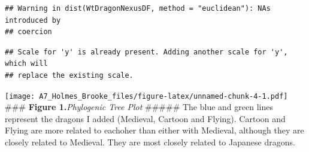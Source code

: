 \documentclass[
]{article}
\newenvironment{Shaded}{\begin{snugshade}}{\end{snugshade}}
\newcommand{\AttributeTok}[1]{\textcolor[rgb]{0.77,0.63,0.00}{#1}}
\newcommand{\CommentTok}[1]{\textcolor[rgb]{0.56,0.35,0.01}{\textit{#1}}}
\newcommand{\DecValTok}[1]{\textcolor[rgb]{0.00,0.00,0.81}{#1}}
\newcommand{\FunctionTok}[1]{\textcolor[rgb]{0.00,0.00,0.00}{#1}}
\newcommand{\NormalTok}[1]{#1}
\newcommand{\OtherTok}[1]{\textcolor[rgb]{0.56,0.35,0.01}{#1}}
\newcommand{\SpecialCharTok}[1]{\textcolor[rgb]{0.00,0.00,0.00}{#1}}
\newcommand{\StringTok}[1]{\textcolor[rgb]{0.31,0.60,0.02}{#1}}
\begin{document}
\begin{verbatim}
## Warning in dist(WtDragonNexusDF, method = "euclidean"): NAs introduced by
## coercion
\end{verbatim}

\begin{Shaded}
\end{Shaded}

\begin{verbatim}
## Scale for 'y' is already present. Adding another scale for 'y', which will
## replace the existing scale.
\end{verbatim}

\texttt{[image: A7\_Holmes\_Brooke\_files/figure-latex/unnamed-chunk-4-1.pdf]}
\#\#\# \textbf{Figure 1.}\emph{Phylogenic Tree Plot} \#\#\#\#\# The blue
and green lines represent the dragons I added (Medieval, Cartoon and
Flying). Cartoon and Flying are more related to eachoher than either
with Medieval, although they are closely related to Medieval. They are
most closely related to Japanese dragons.
\end{document}
